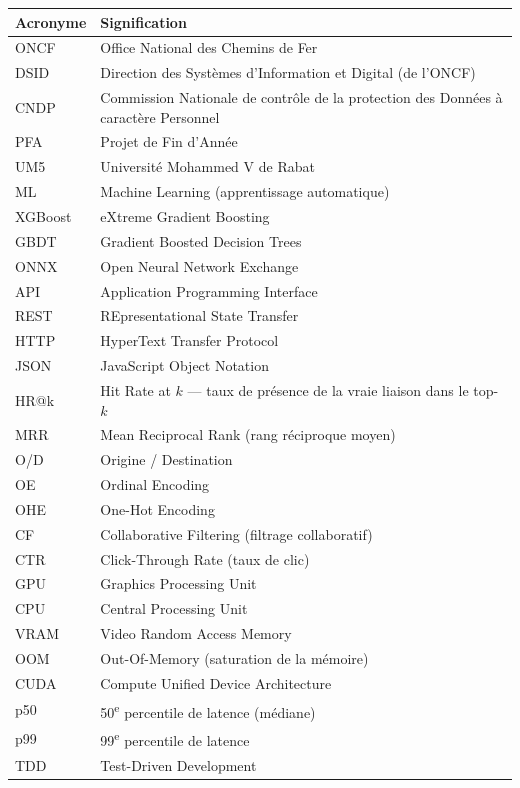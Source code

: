 \documentclass[12pt, a4paper]{report}
\begin{document}
\begin{tabularx}{\textwidth}{|l|X|}
\hline
\textbf{Acronyme} & \textbf{Signification} \\
\hline
ONCF   & Office National des Chemins de Fer \\
\hline
DSID   & Direction des Systèmes d'Information et Digital (de l'ONCF) \\
\hline
CNDP   & Commission Nationale de contrôle de la protection des Données à caractère Personnel \\
\hline
PFA    & Projet de Fin d'Année \\
\hline
UM5    & Université Mohammed V de Rabat \\
\hline
ML     & Machine Learning (apprentissage automatique) \\
\hline
XGBoost & eXtreme Gradient Boosting \\
\hline
GBDT   & Gradient Boosted Decision Trees \\
\hline
ONNX   & Open Neural Network Exchange \\
\hline
API    & Application Programming Interface \\
\hline
REST   & REpresentational State Transfer \\
\hline
HTTP   & HyperText Transfer Protocol \\
\hline
JSON   & JavaScript Object Notation \\
\hline
HR@k   & Hit Rate at $k$ --- taux de présence de la vraie liaison dans le top-$k$ \\
\hline
MRR    & Mean Reciprocal Rank (rang réciproque moyen) \\
\hline
O/D    & Origine / Destination \\
\hline
OE     & Ordinal Encoding \\
\hline
OHE    & One-Hot Encoding \\
\hline
CF     & Collaborative Filtering (filtrage collaboratif) \\
\hline
CTR    & Click-Through Rate (taux de clic) \\
\hline
GPU    & Graphics Processing Unit \\
\hline
CPU    & Central Processing Unit \\
\hline
VRAM   & Video Random Access Memory \\
\hline
OOM    & Out-Of-Memory (saturation de la mémoire) \\
\hline
CUDA   & Compute Unified Device Architecture \\
\hline
p50    & 50\textsuperscript{e} percentile de latence (médiane) \\
\hline
p99    & 99\textsuperscript{e} percentile de latence \\
\hline
TDD    & Test-Driven Development \\
\hline
\end{tabularx}
\end{document}

